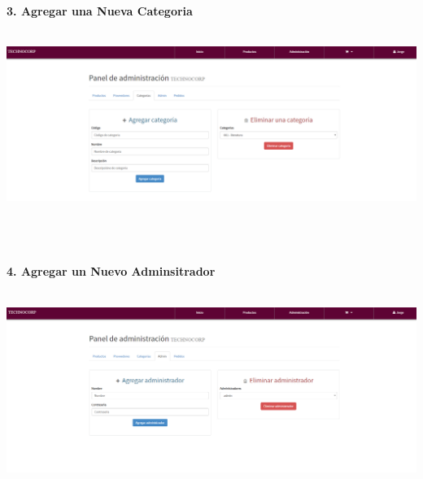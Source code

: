\begin{flushleft}
\begin{itemize}
\begin{center}
\end{center}
\textbf{ }\\
\textbf{ }\\
\textbf{ }\\
\textbf{3. Agregar una Nueva Categoria}\\
\textbf{ }\\
\begin{center}
	\includegraphics[width=18cm]{./Imagenes/back2} 
\end{center}
\textbf{ }\\
\textbf{ }\\
\textbf{ }\\
\textbf{4. Agregar un Nuevo Adminsitrador}\\
\textbf{ }\\
\begin{center}
	\includegraphics[width=18cm]{./Imagenes/back3} 
\end{center}


\end{itemize}
\end{flushleft}

